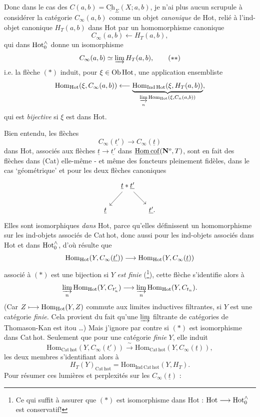 Donc dans le cas des $C(a,b) = \underline{\mathrm{Ch}}_\Sigma(X; a, b)$, je n'ai plus aucun scrupule à considérer la catégorie $C_\infty(a,b)$ comme un objet \textit{canonique} de Hot, relié à l'ind-objet canonique $H_T(a,b)$ dans Hot par un homomorphisme canonique
\[
C_\infty(a,b) \longleftarrow H_T(a,b), \tag*{$(*)$}
\]
qui dans $\mathrm{Hot}^{\wedge}_{0}$ donne un isomorphisme
\[
C_\infty(a,b) \simeq \varinjlim H_T(a,b), \tag*{$(**)$}
\]
i.e. la flèche $(*)$ induit, pour $\xi \in \mathrm{Ob}\,\mathrm{Hot}$, une application ensembliste
\[
\mathrm{Hom}_{\mathrm{Hot}}(\xi, C_\infty(a,b)) \longleftarrow \underbrace{\mathrm{Hom}_{\mathrm{Ind}\,\mathrm{Hot}}(\xi, H_T(a,b))}_{\underset{n}{\varinjlim}\, \mathrm{Hom}_{\mathrm{Hot}}(\xi, C_n(a,b))},
\]
qui est \textit{bijective} si $\xi$ est dans Hot.

Bien entendu, les flèches
\[
C_\infty(\underline{t'}) \longrightarrow C_\infty(\underline{t}) \tag*{$(*)$}
\]
dans Hot, associés aux flèches $\underline{t} \longrightarrow \underline{t'}$ dans $\underline{\mathrm{Hom\,cof}}(\mathbf{N}^o, T)$, sont en fait des flèches dans %
(Cat) elle-même - et même des foncteurs pleinement fidèles, dans le cas ‘géométrique’ et pour les deux flèches canoniques
\[
\begin{tikzcd}[column sep=small]
 & \underline{t} * \underline{t'} \arrow[ld] \arrow[rd] & \\
\underline{t} & & \underline{t'}.
\end{tikzcd}
\]
Elles sont isomorphiques \textit{dans} Hot, parce qu'elles définissent un homomorphisme sur les ind-objets associés de Cat\,hot, donc aussi pour les ind-objets associés dans Hot et dans $\mathrm{Hot}^{\wedge}_{0}$, d'où résulte que
\[
\mathrm{Hom}_{\mathrm{Hot}}(Y, C_\infty(\underline{t'})) \longrightarrow \mathrm{Hom}_{\mathrm{Hot}}(Y, C_\infty(\underline{t}))
\]
associé à $(*)$ est une bijection si $Y$ \textit{est finie} (\footnote[26]{Ce qui suffit à assurer que $(*)$ est isomorphisme dans Hot : $\mathrm{Hot} \longrightarrow \mathrm{Hot}^{\wedge}_{0}$ est conservatif!}), cette flèche s'identifie alors à
\[
\underset{n}{\varinjlim}\, \mathrm{Hom}_{\mathrm{Hot}}(Y, C_{t'_n}) \longrightarrow \underset{n}{\varinjlim}\, \mathrm{Hom}_{\mathrm{Hot}}(Y, C_{t_n}).
\]
(Car $Z \longmapsto \mathrm{Hom}_{\mathrm{Hot}}(Y, Z)$ commute aux limites inductives filtrantes, si $Y$ est une catégorie \textit{finie.} Cela provient du fait qu'une $\varinjlim$ filtrante de catégories de Thomason-Kan est itou \dots) Mais j'ignore par contre si $(*)$ est isomorphisme dans Cat\,hot. Seulement que pour une catégorie \textit{finie} $Y$, elle induit
\[
\mathrm{Hom}_{\mathrm{Cat\,hot}}(Y, C_\infty(\underline{t'})) \xrightarrow{\ \sim\ } \mathrm{Hom}_{\mathrm{Cat\,hot}}(Y, C_\infty(\underline{t})),
\]
les deux membres s'identifiant alors à
\[
H_T(Y)_{\mathrm{Cat\,hot}} = \mathrm{Hom}_{\mathrm{Ind\,Cat\,hot}}(Y, H_T).
\]
Pour résumer ces lumières et perplexités sur les $C_\infty(\underline{t})$ :

